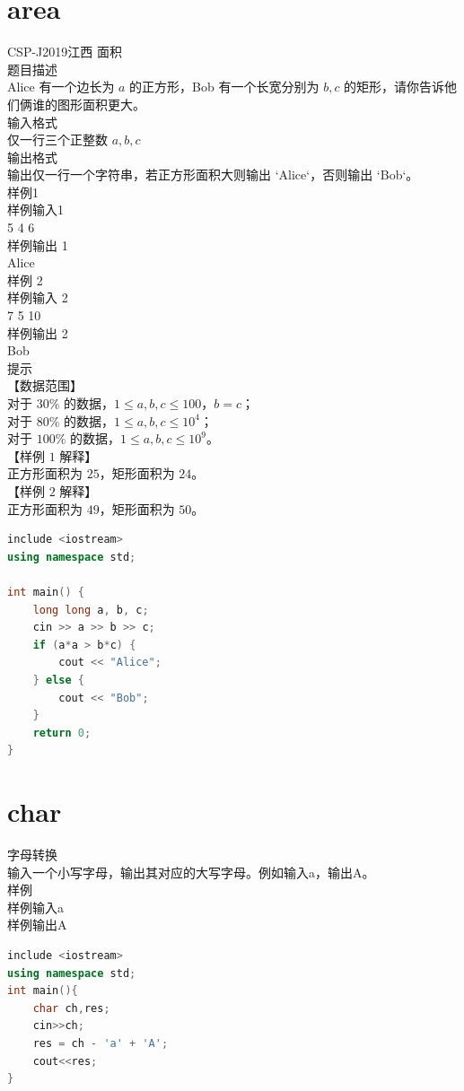 \documentclass[12pt,twiside,a4paper]{ctexbook}
\numberwithin{chapter}{part}
\begin{document}
\section{area}
CSP-J2019江西 面积\\
题目描述\\
Alice 有一个边长为 $a$ 的正方形，Bob 有一个长宽分别为 $b,c$ 的矩形，请你告诉他们俩谁的图形面积更大。\\
输入格式\\
仅一行三个正整数 $a,b,c$\\
输出格式\\
输出仅一行一个字符串，若正方形面积大则输出 `Alice`，否则输出 `Bob`。\\
样例1\\
样例输入1\\
5 4 6\\
样例输出 1\\
Alice\\
样例 2\\
样例输入 2\\
7 5 10\\
样例输出 2\\
Bob\\
提示\\
【数据范围】\\   
对于 $30\%$ 的数据，$1 \le a,b,c \le 100$，$b=c$；\\  
对于 $80\%$ 的数据，$1\le a,b,c \le 10^4$；\\
对于 $100\%$ 的数据，$1\le a,b,c \le 10^9$。\\
【样例 $1$ 解释】\\  
正方形面积为  $25$，矩形面积为 $24$。\\
【样例 $2$ 解释】\\  
正方形面积为  $49$，矩形面积为 $50$。\\
\begin{lstlisting}[language=C++,breaklines=true]
include <iostream>
using namespace std;

int main() {
    long long a, b, c;
    cin >> a >> b >> c;
    if (a*a > b*c) {
        cout << "Alice";
    } else {
        cout << "Bob";
    }
    return 0;
}
\end{lstlisting}

\section{char}
字母转换\\
输入一个小写字母，输出其对应的大写字母。例如输入a，输出A。\\
样例\\
样例输入a\\
样例输出A
\begin{lstlisting}[language=C++,breaklines=true]
include <iostream>
using namespace std;
int main(){
    char ch,res;
    cin>>ch;
    res = ch - 'a' + 'A';
    cout<<res;
}
\end{lstlisting}
\end{document}
